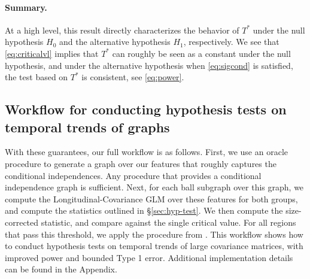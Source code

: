 \paragraph{Summary.} At a high level, this result directly characterizes the behavior of $T^*$ under the null hypothesis $H_0$ and 
the alternative hypothesis $H_1$, respectively. 
We see that \eqref{eq:criticalvl} implies that $T^*$ can roughly be seen as a constant under the null hypothesis, 
and under the alternative hypothesis when \eqref{eq:sigcond} is satisfied, the test based on $T^*$ is consistent, see \eqref{eq:power}. 

\subsection{Workflow for conducting hypothesis tests on temporal trends of graphs}
With these guarantees, our full workflow is as follows. First, we use an oracle procedure to generate a graph over our features 
that roughly captures the conditional independences. Any procedure that provides a conditional independence graph is sufficient. 
Next, for each ball subgraph over this graph, we compute the Longitudinal-Covariance GLM over these features for both groups, and compute the statistics outlined in \S\ref{sec:hyp-test}. We then compute the size-corrected statistic, and compare against the single critical value. For all regions that pass this threshold, we apply the procedure from \cite{jeng2010optimal}. This workflow shows how to conduct hypothesis tests on temporal trends of large covariance matrices, with improved 
power and bounded Type 1 error. Additional implementation details can be found in the Appendix.
